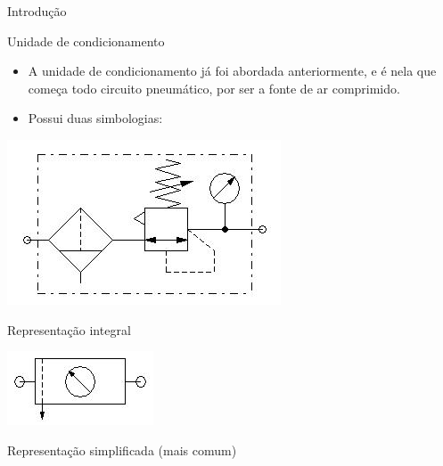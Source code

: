 \begin{frame}{Introdução}
\begin{block}{Unidade de condicionamento}
	\begin{itemize}
		\item A unidade de condicionamento já foi abordada anteriormente, e é nela que começa todo circuito pneumático, por ser a fonte de ar comprimido.
		\item Possui duas simbologias:
	\end{itemize}
\end{block}

\begin{minipage}[c]{0.45\linewidth}
	\centering
	\includegraphics[width=1\linewidth]{Figuras/Ch14/fig02}
	
	Representação integral
\end{minipage}
\hfill
\begin{minipage}[c]{0.45\linewidth}
	\centering
	\includegraphics[width=1\linewidth]{Figuras/Ch14/fig03}
	
	Representação simplificada (mais comum)
\end{minipage}
\end{frame}


